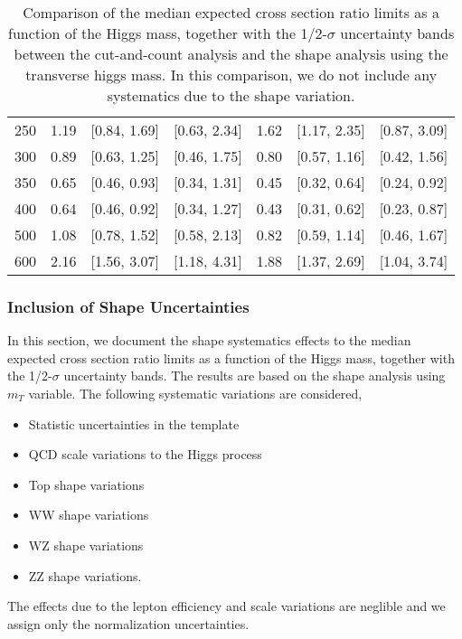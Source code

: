 \begin{table}[!ht]
\begin{center}
{\begin{tabular}{|l|c|c|c|c|c|c|}
\hline
250 & 1.19 & [0.84, 1.69] & [0.63, 2.34] & 1.62 & [1.17, 2.35] & [0.87, 3.09] \\
300 & 0.89 & [0.63, 1.25] & [0.46, 1.75] & 0.80 & [0.57, 1.16] & [0.42, 1.56] \\
350 & 0.65 & [0.46, 0.93] & [0.34, 1.31] & 0.45 & [0.32, 0.64] & [0.24, 0.92] \\
400 & 0.64 & [0.46, 0.92] & [0.34, 1.27] & 0.43 & [0.31, 0.62] & [0.23, 0.87]\\
500 & 1.08 & [0.78, 1.52] & [0.58, 2.13] & 0.82 & [0.59, 1.14] & [0.46, 1.67] \\
600 & 2.16 & [1.56, 3.07] & [1.18, 4.31] & 1.88 & [1.37, 2.69] & [1.04, 3.74]\\
\hline
\end{tabular}
}
\caption{ 
Comparison of the median expected cross section ratio limits as a function 
of the Higgs mass, together with the 1/2-$\sigma$ uncertainty bands between the cut-and-count 
analysis and the shape analysis using the transverse higgs mass. 
In this comparison, we do not include any systematics due to the shape variation. }
\label{tab:mvashape_mevsbdt_hzz}
\end{center}
\end{table}

\subsubsection{Inclusion of Shape Uncertainties}

In this section, we document the shape systematics effects to the median expected cross section 
ratio limits as a function of the Higgs mass, together with the 1/2-$\sigma$ uncertainty bands. 
The results are based on the shape analysis using $m_T$ variable. 
The following systematic variations are considered,
\begin{itemize}
\item {Statistic uncertainties in the template}
\item {QCD scale variations to the Higgs process}
\item {Top shape variations}
\item {WW shape variations}
\item {WZ shape variations}
\item {ZZ shape variations}.
\end{itemize}
The effects due to the lepton efficiency and scale variations are neglible and we assign only 
the normalization uncertainties. 

